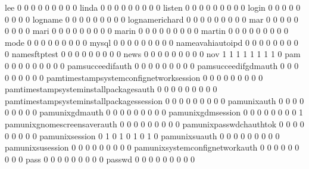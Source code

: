 \documentclass[compress,8pt]{beamer}
\begin{document}
\begin{frame}
\begin{Schunk}
  lee                                        0   0   0   0   0   0   0   0   0
  linda                                      0   0   0   0   0   0   0   0   0
  listen                                     0   0   0   0   0   0   0   0   0
  login                                      0   0   0   0   0   0   0   0   0
  logname                                    0   0   0   0   0   0   0   0   0
  lognamerichard                             0   0   0   0   0   0   0   0   0
  mar                                        0   0   0   0   0   0   0   0   0
  mari                                       0   0   0   0   0   0   0   0   0
  marin                                      0   0   0   0   0   0   0   0   0
  martin                                     0   0   0   0   0   0   0   0   0
  mode                                       0   0   0   0   0   0   0   0   0
  mysql                                      0   0   0   0   0   0   0   0   0
  nameavahiautoipd                           0   0   0   0   0   0   0   0   0
  namesftptest                               0   0   0   0   0   0   0   0   0
  news                                       0   0   0   0   0   0   0   0   0
  nov                                        1   1   1   1   1   1   1   1   0
  pam                                        0   0   0   0   0   0   0   0   0
  pamsucceedifauth                           0   0   0   0   0   0   0   0   0
  pamsucceedifgdmauth                        0   0   0   0   0   0   0   0   0
  pamtimestampsystemconfignetworksession     0   0   0   0   0   0   0   0   0
  pamtimestampsysteminstallpackagesauth      0   0   0   0   0   0   0   0   0
  pamtimestampsysteminstallpackagessession   0   0   0   0   0   0   0   0   0
  pamunixauth                                0   0   0   0   0   0   0   0   0
  pamunixgdmauth                             0   0   0   0   0   0   0   0   0
  pamunixgdmsession                          0   0   0   0   0   0   0   0   1
  pamunixgnomescreensaverauth                0   0   0   0   0   0   0   0   0
  pamunixpasswdchauthtok                     0   0   0   0   0   0   0   0   0
  pamunixsession                             0   1   0   1   0   1   0   1   0
  pamunixsuauth                              0   0   0   0   0   0   0   0   0
  pamunixsusession                           0   0   0   0   0   0   0   0   0
  pamunixsystemconfignetworkauth             0   0   0   0   0   0   0   0   0
  pass                                       0   0   0   0   0   0   0   0   0
  passwd                                     0   0   0   0   0   0   0   0   0

\end{Schunk}
\end{frame}
\end{document}

